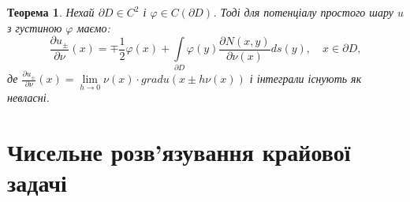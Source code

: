 \documentclass[a4 paper,12pt,ukrainian]{report}
\newtheorem{theorem}{\textbf{Теорема}}[chapter]
\begin{document}
\begin{theorem}\cite{Kress}
Нехай $\partial D\in C^2$ і $\varphi\in C(\partial D)$. Тоді для потенціалу простого шару $u$ з густиною $\varphi$ маємо:
\begin{equation*}
\frac{\partial u_\pm}{\partial\nu}(x)=\mp\frac{1}{2}\varphi(x)+\int\limits_{\partial D}\varphi(y)\frac{\partial N(x,y)}{\partial\nu(x)} ds(y) , \quad x \in \partial D,
\end{equation*}
де $\frac{\partial u_\pm}{\partial\nu}(x)=\lim\limits_{h \to 0}\nu(x)\cdot gradu(x\pm h\nu(x))$ і інтеграли існують як невласні.
\end{theorem}



\chapter{Чисельне розв'язування крайової задачі}
\end{document}
